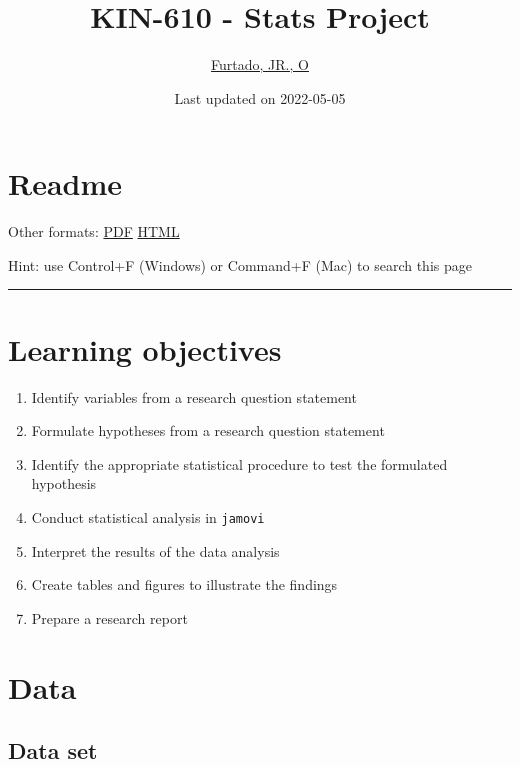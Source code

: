 \documentclass[
]{article}
\title{KIN-610 - Stats Project}
\author{\href{http://drfurtado.us}{Furtado, JR., O}}
\date{Last updated on 2022-05-05}
\providecommand{\tightlist}{%
  \setlength{\itemsep}{0pt}\setlength{\parskip}{0pt}}
\begin{document}
\maketitle

{
\setcounter{tocdepth}{2}
\tableofcontents
}
\hypertarget{readme}{%
\section{Readme}\label{readme}}

Other formats: \href{project1.pdf}{PDF} \textbar{} \href{project1.html}{HTML}

Hint: use Control+F (Windows) or Command+F (Mac) to search this page

\begin{center}\rule{0.5\linewidth}{0.5pt}\end{center}

\hypertarget{learning-objectives}{%
\section{Learning objectives}\label{learning-objectives}}

\begin{enumerate}
\def\labelenumi{\arabic{enumi}.}
\tightlist
\item
  Identify variables from a research question statement
\item
  Formulate hypotheses from a research question statement
\item
  Identify the appropriate statistical procedure to test the formulated hypothesis
\item
  Conduct statistical analysis in \texttt{jamovi}
\item
  Interpret the results of the data analysis
\item
  Create tables and figures to illustrate the findings
\item
  Prepare a research report
\end{enumerate}

\hypertarget{data}{%
\section{Data}\label{data}}

\hypertarget{data-set}{%
\subsection{Data set}\label{data-set}}
\end{document}
